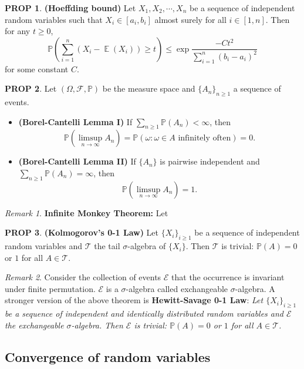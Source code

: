 \documentclass[hidelinks,11pt]{article}
\theoremstyle{definition}
\theoremstyle{dotless}
\newtheorem{prop}{PROP}[section]
\theoremstyle{remark}
\newtheorem*{remark}{Remark}
\DeclareMathOperator{\E}{\mathbb{E}}
\DeclareMathOperator{\1}{\mathbf{1}}
\begin{document}
\begin{prop}\textup{\textbf{(Hoeffding bound)}} Let $X_1,X_2,\cdots,X_n$ be a sequence of independent random variables such that $X_i\in[a_i,b_i]$ almost surely for all $i\in[1,n]$. Then for any $t\geq0$,
\[\mathbb{P}\left(\sum_{i=1}^n(X_i-\E(X_i))\geq t\right)\leq\exp{\frac{-Ct^2}{\sum_{i=1}^n(b_i-a_i)^2}}\]
for some constant $C$.
\end{prop}

\begin{prop}Let $(\Omega,\mathcal{F},\mathbb{P})$ be the measure space and $\{A_n\}_{n\geq1}$ a sequence of events.\begin{itemize}
    \item\textup{\textbf{(Borel-Cantelli Lemma I)}} If $\sum_{n\geq1}\mathbb{P}(A_n)<\infty$, then
\[\mathbb{P}(\limsup_{n\to\infty}A_n)=\mathbb{P}(\omega:\omega\in A\textrm{ infinitely often})=0.\]
    \item\textup{\textbf{(Borel-Cantelli Lemma II)}} If $\{A_n\}$ is pairwise independent and $\sum_{n\geq1}\mathbb{P}(A_n)=\infty$, then
    \[\mathbb{P}(\limsup_{n\to\infty}A_n)=1.\]
\end{itemize}
\end{prop}

\begin{remark}\textup{\textbf{Infinite Monkey Theorem:}} Let
\end{remark}

\begin{prop}\textup{\textbf{(Kolmogorov's 0-1 Law)}} Let $\{X_i\}_{i\geq1}$ be a sequence of independent random variables and $\mathcal{T}$ the tail $\sigma$-algebra of $\{X_i\}$. Then $\mathcal{T}$ is trivial: $\mathbb{P}(A)=0$ or $1$ for all $A\in\mathcal{T}$.
\end{prop}

\begin{remark}
Consider the collection of events $\mathcal{E}$ that the occurrence is invariant under finite permutation. $\mathcal{E}$ is a $\sigma$-algebra called exchangeable $\sigma$-algebra. A stronger version of the above theorem is \textbf{Hewitt-Savage 0-1 Law}:\smallbreak
\textit{Let $\{X_i\}_{i\geq1}$ be a sequence of independent and identically distributed random variables and $\mathcal{E}$ the exchangeable $\sigma$-algebra. Then $\mathcal{E}$ is trivial: $\mathbb{P}(A)=0$ or $1$ for all $A\in\mathcal{T}$.}
\end{remark}

\subsection{Convergence of random variables}
\end{document}
